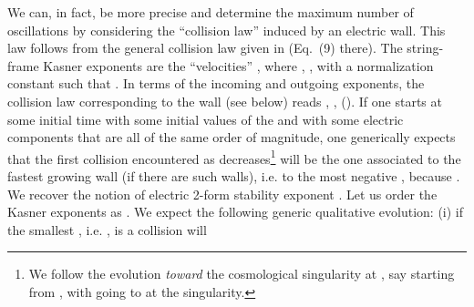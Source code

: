 \documentclass[a4paper,12pt]{article}
\begin{document}
We can, in fact, be 
more precise and determine the maximum number of oscillations by 
considering the ``collision law'' induced by an electric wall. This law 
follows from the general collision law given in \cite{dh1} (Eq.~(9) 
there). The  string-frame Kasner exponents are the ``velocities''
\coordHE{}, where 
\coordHE{}, \coordHE{}, with a normalization constant
\myHighlight{$\lambda$}\coordHE{} such that \coordHE{}.
In terms of the incoming \coordHE{} and outgoing \coordHE{} 
 exponents, the collision law corresponding to the wall
 \coordHE{}
(see below) reads
\coordHE{},  \coordHE{}, \coordHE{} (\coordHE{}). 
If one starts at some initial time 
\coordHE{} with some initial values of the \coordHE{} and 
with some electric components \coordHE{} that are all of the same 
order of magnitude, one generically expects that the first collision 
encountered as \myHighlight{$\overline \tau$}\coordHE{} decreases\footnote{We follow the 
evolution {\it toward} the cosmological singularity at \coordHE{}, 
say starting from \coordHE{}, with \coordHE{} going to \myHighlight{$-\infty$}\coordHE{} at the 
singularity.} will be the one associated to the fastest growing wall (if 
there are such walls), i.e. to the most negative \coordHE{}, 
because \coordHE{}.
We recover the notion of electric 2-form stability exponent \coordHE{}. Let us order the Kasner exponents 
as \coordHE{}. We expect the 
following generic qualitative evolution: (i) if the smallest \coordHE{}, i.e. \coordHE{}, is \coordHE{} a collision will 
\end{document}

